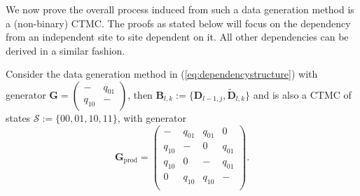 We now prove the overall process induced from such a data generation method is a (non-binary) CTMC. The proofs as stated below will focus on the dependency from an independent site to site dependent on it. All other dependencies can be derived in a similar fashion.
\begin{proposition}
\label{prop:ctmcprod}
    Consider the data generation method in (\ref{eq:dependencystructure}) with generator $\mathbf{G} = \begin{pmatrix}
         - & q_{01} \\
         q_{10 } & - \end{pmatrix}$, 
         then $\mathbf{B}_{l, k}:= \{\mathbf{D}_{l-1, j}, \tilde{\mathbf{D}}_{l, k}\}$ and is also a CTMC of states $\mathcal{S} := \{00, 01, 10, 11\}$, with generator
    \begin{equation}
    \label{eq:ctmcprodgenerator}
    \mathbf{G}_{\text{prod}} = \begin{pmatrix}
        - & q_{01} & q_{01} & 0 \\
         q_{10} & - & 0 & q_{01} \\
         q_{10} & 0 & - & q_{01} \\
         0 & q_{10} & q_{10} & - \\
    \end{pmatrix}.
    \end{equation}
\end{proposition}
